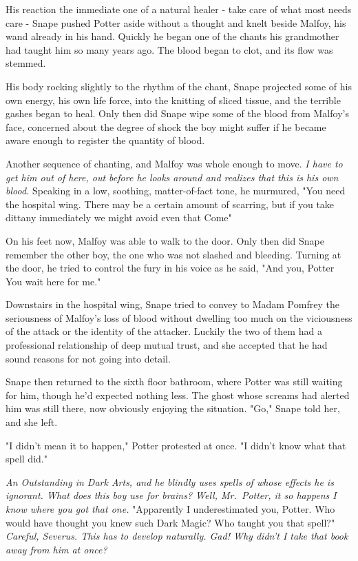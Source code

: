 His reaction the immediate one of a natural healer - take care of what most needs care - Snape pushed Potter aside without a thought and knelt beside Malfoy, his wand already in his hand. Quickly he began one of the chants his grandmother had taught him so many years ago. The blood began to clot, and its flow was stemmed.

His body rocking slightly to the rhythm of the chant, Snape projected some of his own energy, his own life force, into the knitting of sliced tissue, and the terrible gashes began to heal. Only then did Snape wipe some of the blood from Malfoy's face, concerned about the degree of shock the boy might suffer if he became aware enough to register the quantity of blood.

Another sequence of chanting, and Malfoy was whole enough to move. \emph{I have to get him out of here, out before he looks around and realizes that this is his own blood.} Speaking in a low, soothing, matter-of-fact tone, he murmured, "You need the hospital wing. There may be a certain amount of scarring, but if you take dittany immediately we might avoid even that{\el} Come{\el}"

On his feet now, Malfoy was able to walk to the door. Only then did Snape remember the other boy, the one who was not slashed and bleeding. Turning at the door, he tried to control the fury in his voice as he said, "And you, Potter{\el} You wait here for me."

Downstairs in the hospital wing, Snape tried to convey to Madam Pomfrey the seriousness of Malfoy's loss of blood without dwelling too much on the viciousness of the attack or the identity of the attacker. Luckily the two of them had a professional relationship of deep mutual trust, and she accepted that he had sound reasons for not going into detail.

Snape then returned to the sixth floor bathroom, where Potter was still waiting for him, though he'd expected nothing less. The ghost whose screams had alerted him was still there, now obviously enjoying the situation. "Go," Snape told her, and she left.

"I didn't mean it to happen," Potter protested at once. "I didn't know what that spell did."

\emph{An Outstanding in Dark Arts, and he blindly uses spells of whose effects he is ignorant. What does this boy use for brains? Well, Mr.~Potter, it so happens I know where you got that one.} "Apparently I underestimated you, Potter. Who would have thought you knew such Dark Magic? Who taught you that spell?" \emph{Careful, Severus. This has to develop naturally. Gad! Why didn't I take that book away from him at once?}


